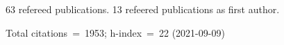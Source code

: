 63 refereed publications. 13 refeered publications as first author.

Total citations~=~1953; h-index~=~22 (2021-09-09)